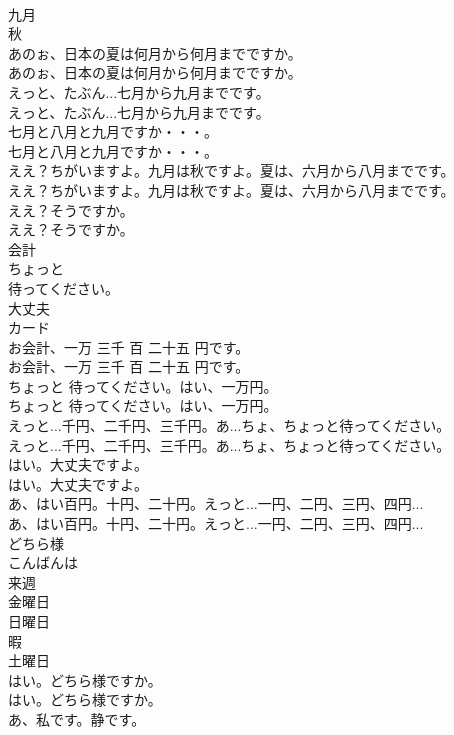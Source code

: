 \documentclass[8pt]{extreport}
\begin{document}
\begin{CJK}{UTF8}{min}
\\	九月
\\	秋
\\	あのぉ、日本の夏は何月から何月までですか。	
\\	あのぉ、日本の夏は何月から何月までですか。 
\\	えっと、たぶん...七月から九月までです。	
\\	えっと、たぶん...七月から九月までです。 
\\	七月と八月と九月ですか・・・。	
\\	七月と八月と九月ですか・・・。 
\\	ええ？ちがいますよ。九月は秋ですよ。夏は、六月から八月までです。	
\\	ええ？ちがいますよ。九月は秋ですよ。夏は、六月から八月までです。 
\\	ええ？そうですか。	
\\	ええ？そうですか。 
\\	会計
\\	ちょっと
\\	待ってください。
\\	大丈夫
\\	カード
\\	お会計、一万 三千 百 二十五 円です。	
\\	お会計、一万 三千 百 二十五 円です。 
\\	ちょっと 待ってください。はい、一万円。	
\\	ちょっと 待ってください。はい、一万円。 
\\	えっと...千円、二千円、三千円。あ...ちょ、ちょっと待ってください。	
\\	えっと...千円、二千円、三千円。あ...ちょ、ちょっと待ってください。 
\\	はい。大丈夫ですよ。	
\\	はい。大丈夫ですよ。 
\\	あ、はい百円。十円、二十円。えっと...一円、二円、三円、四円...	
\\	あ、はい百円。十円、二十円。えっと...一円、二円、三円、四円... 
\\	どちら様
\\	こんばんは
\\	来週
\\	金曜日
\\	日曜日
\\	暇
\\	土曜日
\\	はい。どちら様ですか。	
\\	はい。どちら様ですか。 
\\	あ、私です。静です。	

\end{CJK}
\end{document}
